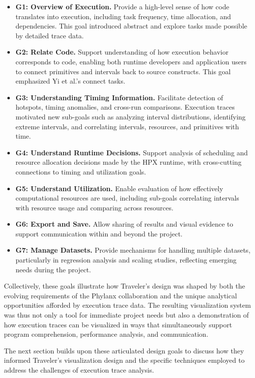 \begin{refsection}
\begin{itemize}
  \item \textbf{G1: Overview of Execution.} Provide a high-level sense of how code translates into execution, including task frequency, time allocation, and dependencies. This goal introduced abstract and explore tasks made possible by detailed trace data.  
  \item \textbf{G2: Relate Code.} Support understanding of how execution behavior corresponds to code, enabling both runtime developers and application users to connect primitives and intervals back to source constructs. This goal emphasized Yi et al.'s connect tasks.  
  \item \textbf{G3: Understanding Timing Information.} Facilitate detection of hotspots, timing anomalies, and cross-run comparisons. Execution traces motivated new sub-goals such as analyzing interval distributions, identifying extreme intervals, and correlating intervals, resources, and primitives with time.  
  \item \textbf{G4: Understand Runtime Decisions.} Support analysis of scheduling and resource allocation decisions made by the HPX runtime, with cross-cutting connections to timing and utilization goals.  
  \item \textbf{G5: Understand Utilization.} Enable evaluation of how effectively computational resources are used, including sub-goals correlating intervals with resource usage and comparing across resources.  
  \item \textbf{G6: Export and Save.} Allow sharing of results and visual evidence to support communication within and beyond the project.  
  \item \textbf{G7: Manage Datasets.} Provide mechanisms for handling multiple datasets, particularly in regression analysis and scaling studies, reflecting emerging needs during the project.  
\end{itemize}

Collectively, these goals illustrate how Traveler's design was shaped by both the evolving requirements of the Phylanx collaboration and the unique analytical opportunities afforded by execution trace data. The resulting visualization system was thus not only a tool for immediate project needs but also a demonstration of how execution traces can be visualized in ways that simultaneously support program comprehension, performance analysis, and communication.

The next section builds upon these articulated design goals to discuss how they informed Traveler's visualization design and the specific techniques employed to address the challenges of execution trace analysis.


\end{refsection}

